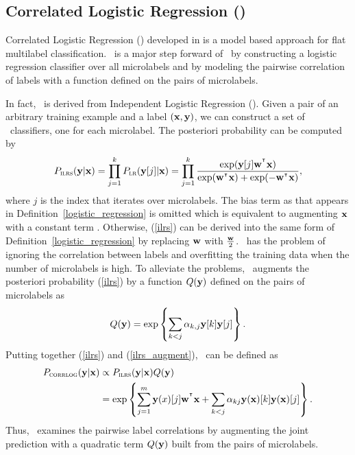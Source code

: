 {%
%
\subsection{Correlated Logistic Regression (\corrlog)} \label{sc_corrlog}

Correlated Logistic Regression (\corrlog) developed in \citep{Bian12corrlog} is a model based approach for flat multilabel classification.
\corrlog\ is a major step forward of \iblr\ by constructing a logistic regression classifier over all microlabels and by modeling the pairwise correlation of labels with a function defined on the pairs of microlabels.

In fact, \corrlog\ is derived from Independent Logistic Regression (\ilrs). 
Given a pair of an arbitrary training example and a label $(\mathbf {x},\mathbf {y})$, we can construct a set of \ilrs\ classifiers, one for each microlabel.
The posteriori probability can be computed by
\begin{align}
	P_{\text{{\sc ilrs}}}(\mathbf {y}|\mathbf {x}) 
	= \prod_{j=1}^{k}P_{\text{{\sc lr}}}(\mathbf {y}[j]|\mathbf {x})
	= \prod_{j=1}^{k}\frac{\exp(\mathbf {y}[j]\mathbf {w}^{^{\intercal}}\mathbf {x})}{\exp(\mathbf {w}^{^{\intercal}}\mathbf {x})+\exp(-\mathbf {w}^{^{\intercal}}\mathbf {x})}, \label{ilrs}
\end{align}
where $j$ is the index that iterates over microlabels. 
The bias term as that appears in Definition~\ref{logistic_regression} is omitted which is equivalent to augmenting $\mathbf {x}$ with a constant term \citep{Bian12corrlog}.
Otherwise, (\ref{ilrs}) can be derived into the same form of Definition~\ref{logistic_regression} by replacing $\mathbf {w}$ with $\frac{\mathbf {w}}{2}$.
\ilrs\ has the problem of ignoring the correlation between labels and overfitting the training data when the number of microlabels is high.
To alleviate the problems, \corrlog\ augments the posteriori probability (\ref{ilrs}) by a function $Q(\mathbf {y})$ defined on the pairs of microlabels as
\begin{align}
	Q(\mathbf {y}) = \exp\left\{\sum_{k<j}\alpha_{k,j}\mathbf {y}[k]\mathbf {y}[j]\right\}. \label{ilrs_augment}
\end{align}
Putting together (\ref{ilrs}) and (\ref{ilrs_augment}), \corrlog\ can be defined as
\begin{align*}
	P_{\text{{\sc corrlog}}}(\mathbf {y}|\mathbf {x}) &\propto P_{\text{{\sc ilrs}}}(\mathbf {y}|\mathbf {x}) Q(\mathbf {y}) \\
		&=\exp\left\{ \sum_{j=1}^{m}\mathbf {y}(x)[j]\mathbf {w}^{^{\intercal}}\mathbf {x} + \sum_{k<j}\alpha_{kj}\mathbf {y}(\mathbf {x})[k]\mathbf {y}(\mathbf {x})[j] \right\}.
\end{align*}
Thus, \corrlog\ examines the pairwise label correlations by augmenting the joint prediction with a quadratic term $Q(\mathbf {y})$ built from the pairs of microlabels.



}
